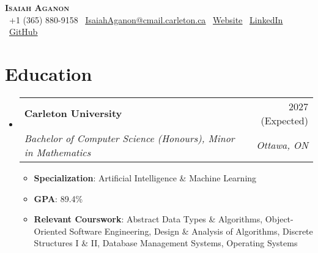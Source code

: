 \documentclass[letterpaper,11pt]{article}
\makeatletter
\newcommand{\resumeItem}[1]{
  \item\small{
    {#1 \vspace{-2pt}}
  }
}
\newcommand{\resumeSubheading}[4]{
  \vspace{-2pt}\item
    \begin{tabular*}{0.97\textwidth}[t]{l@{\extracolsep{\fill}}r}
      \textbf{#1} & #2 \\
      \textit{\small#3} & \textit{\small #4} \\
    \end{tabular*}\vspace{-7pt}
}
\newcommand{\resumeSubHeadingListStart}{\begin{itemize}[leftmargin=0.15in, label={}]}
\newcommand{\resumeSubHeadingListEnd}{\end{itemize}}
\newcommand{\resumeItemListStart}{\begin{itemize}}
\newcommand{\resumeItemListEnd}{\end{itemize}\vspace{-5pt}}
\makeatother
\begin{document}

\begin{center}
  \textbf{\Huge \scshape Isaiah Aganon} \\ \vspace{1pt}
  \small
  \faPhone\ +1 (365) 880-9158  
  \hspace{5pt}
  \faEnvelope\ \href{mailto:IsaiahAganon@cmail.carleton.ca?subject=Re:%20Internship%20Application%20Status&body=Hello%20Isaiah,}{\uline{IsaiahAganon@cmail.carleton.ca}} 
  \hspace{5pt}
  \faGlobe\ \href{https://webpage-aganonisaiahs-projects.vercel.app/}{\uline{Website}}
  \hspace{5pt}
  \faLinkedin\ \href{https://www.linkedin.com/in/isaiah-aganon-888b892a8/}{\uline{LinkedIn}}
  \hspace{5pt}
  \faGithub\ \href{https://github.com/AganonIsaiah}{\uline{GitHub}}
\end{center}


\section{Education}
\resumeSubHeadingListStart
    \resumeSubheading
      {Carleton University}{2027 (Expected)}
      {Bachelor of Computer Science (Honours), Minor in Mathematics}{Ottawa, ON}
      \resumeItemListStart
        \resumeItem{{\bf Specialization}: Artificial Intelligence \& Machine Learning}
        \resumeItem{{\bf GPA}: 89.4\%}
       \resumeItem{{\bf Relevant Courswork}: Abstract Data Types \& Algorithms, Object-Oriented Software Engineering, Design \& Analysis of Algorithms, Discrete Structures I \& II, Database Management Systems, Operating Systems}
      \resumeItemListEnd
\resumeSubHeadingListEnd
\end{document}

